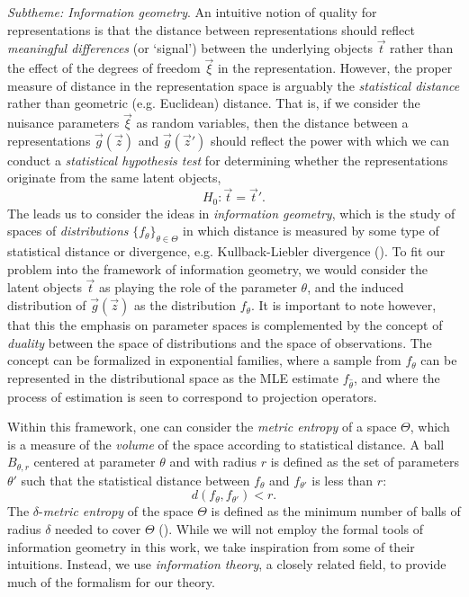 \emph{Subtheme: Information geometry}.  An intuitive notion of quality
for representations is that the distance between representations
should reflect \emph{meaningful differences} (or `signal') between the
underlying objects $\vec{t}$ rather than the effect of the degrees of
freedom $\vec{\xi}$ in the representation.  However, the proper
measure of distance in the representation space is arguably the
\emph{statistical distance} rather than geometric (e.g. Euclidean)
distance.  That is, if we consider the nuisance parameters $\vec{\xi}$
as random variables, then the distance between a representations
$\vec{g}(\vec{z})$ and $\vec{g}(\vec{z}')$ should reflect the power
with which we can conduct a \emph{statistical hypothesis test} for
determining whether the representations originate from the same latent objects, 
\[
H_0: \vec{t} = \vec{t}'.
\]
The leads us to consider the ideas in \emph{information geometry},
which is the study of spaces of \emph{distributions}
$\{f_\theta\}_{\theta \in \Theta}$ in which distance is measured by
some type of statistical distance or divergence, e.g. Kullback-Liebler
divergence (\cite{amari2007methods}).  To fit our problem into the
framework of information geometry, we would consider the latent
objects $\vec{t}$ as playing the role of the parameter $\theta$, and
the induced distribution of $\vec{g}(\vec{z})$ as the distribution
$f_\theta$.  It is important to note however, that this the emphasis
on parameter spaces is complemented by the concept of \emph{duality}
between the space of distributions and the space of observations.  The
concept can be formalized in exponential families, where a sample from
$f_\theta$ can be represented in the distributional space as the MLE
estimate $f_{\hat{\theta}}$, and where the process of estimation is
seen to correspond to projection operators.

Within this framework, one can consider the \emph{metric
  entropy} of a space $\Theta$, which is a measure of the
\emph{volume} of the space according to statistical distance.  A ball
$B_{\theta, r}$ centered at parameter $\theta$ and with radius $r$ is
defined as the set of parameters $\theta'$ such that the statistical
distance between $f_\theta$ and $f_{\theta'}$ is less than $r$:
\[d(f_{\theta}, f_{\theta'}) < r.\]
The $\delta$-\emph{metric entropy} of the space $\Theta$ is defined as
the minimum number of balls of radius $\delta$ needed to cover
$\Theta$ (\cite{adler2009random}).  While we will not employ the
formal tools of information geometry in this work, we take inspiration
from some of their intuitions.  Instead, we use \emph{information
  theory}, a closely related field, to provide much of the formalism
for our theory.

